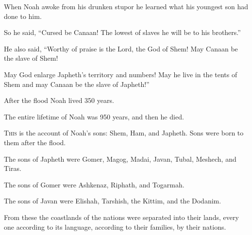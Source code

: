 \begin{scripture}
 When Noah awoke from his drunken stupor he learned what his youngest son had done to him.
\everypar{}

 So he said, ``Cursed be Canaan! The lowest of slaves he will be to his brothers.''
\everypar{}

 He also said, ``Worthy of praise is the Lord, the God of Shem! May Canaan be the slave of Shem!
\everypar{}

 May God enlarge Japheth's territory and numbers! May he live in the tents of Shem and may Canaan be the slave of Japheth!''
\everypar{}

 After the flood Noah lived 350 years.
 The entire lifetime of Noah was 950 years, and then he died.

 \allowchapbreak\hypertarget{ch-genesis-10}{}\lettrine[lines=5]{\color{pentateuch}T}{\textsc{his}} is the account of Noah's sons: Shem, Ham, and Japheth. Sons were born to them after the flood.\everypar{}
\\\indent{} The sons of Japheth were Gomer, Magog, Madai, Javan, Tubal, Meshech, and Tiras.
 The sons of Gomer were Ashkenaz, Riphath, and Togarmah.
 The sons of Javan were Elishah, Tarshish, the Kittim, and the Dodanim.
 From these the coastlands of the nations were separated into their lands, every one according to its language, according to their families, by their nations.
\everypar{}


\end{scripture}
